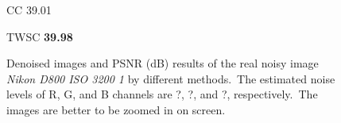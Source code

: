 \begin{figure}
{\begin{minipage}[t]{0.19\textwidth}
{\footnotesize CC 39.01}
\end{minipage}
\begin{minipage}[t]{0.19\textwidth}
\centering
{}
{\footnotesize TWSC \textbf{39.98}}
\end{minipage}
}
    \caption{Denoised images and PSNR (dB) results of the real noisy image \textsl{Nikon D800 ISO 3200 1} \cite{crosschannel2016} by different methods.\ The estimated noise levels of R, G, and B channels are ?, ?, and ?, respectively.\ The images are better to be zoomed in on screen.}
    \label{fig5-14}
\end{figure}



